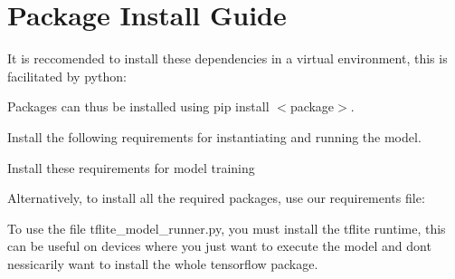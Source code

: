 \chapter{Package Install Guide}
\hypertarget{md_guides_2packages}{}\label{md_guides_2packages}
\label{md_guides_2packages_autotoc_md22}%
%


It is reccomended to install these dependencies in a virtual environment, this is facilitated by {\ttfamily python}\+:


\begin{DoxyCode}{0}

\end{DoxyCode}


Packages can thus be installed using {\ttfamily pip install \texorpdfstring{$<$}{<}package\texorpdfstring{$>$}{>}}.

Install the following requirements for instantiating and running the model.


\begin{DoxyCode}{0}

\end{DoxyCode}


Install these requirements for model training


\begin{DoxyCode}{0}

\end{DoxyCode}


Alternatively, to install all the required packages, use our requirements file\+:


\begin{DoxyCode}{0}

\end{DoxyCode}


To use the file {\ttfamily tflite\+\_\+model\+\_\+runner.\+py}, you must install the tflite runtime, this can be useful on devices where you just want to execute the model and don\textquotesingle{}t nessicarily want to install the whole tensorflow package.


\begin{DoxyCode}{0}

\end{DoxyCode}
 